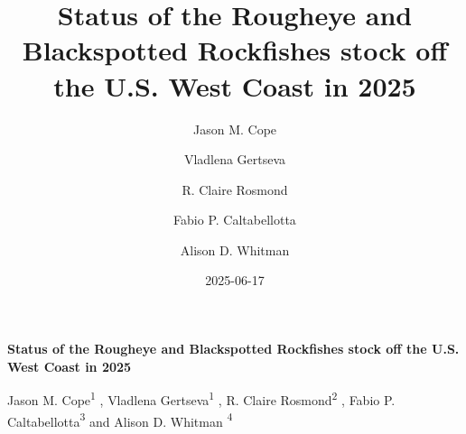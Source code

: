 \documentclass[
]{scrartcl}
\title{Status of the Rougheye and Blackspotted Rockfishes stock off the
U.S. West Coast in 2025}
\author{Jason M. Cope \and Vladlena Gertseva \and R. Claire
Rosmond \and Fabio P. Caltabellotta \and Alison D. Whitman}
\date{2025-06-17}
\begin{document}
  \begin{titlepage}

  \begin{minipage}[b][\textheight][s]{\textwidth}


  \raggedright




  {\huge\bfseries\nohyphens{Status of the Rougheye and Blackspotted
  Rockfishes stock off the U.S. West Coast in 2025}}\\[1\baselineskip]



  \vspace{1\baselineskip}


  \vspace{1\baselineskip}

   {\large{Jason M. Cope}}{\textsuperscript{1}}%
  ,
   {\large{Vladlena Gertseva}}{\textsuperscript{1}}%
  ,
   {\large{R. Claire Rosmond}}{\textsuperscript{2}}%
  ,
   {\large{Fabio P. Caltabellotta}}{\textsuperscript{3}}%
  { and \large{Alison D. Whitman}}%
  {\textsuperscript{4}}%



  \vspace{2\baselineskip}


\end{minipage}
\end{titlepage}
\end{document}
